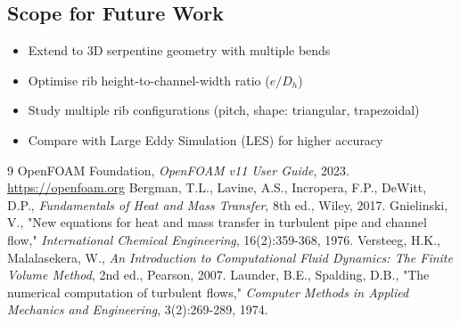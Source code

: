 \documentclass[12pt, a4paper]{article}
\begin{document}
\subsection{Scope for Future Work}
\begin{itemize}
    \item Extend to 3D serpentine geometry with multiple bends
    \item Optimise rib height-to-channel-width ratio ($e/D_h$)
    \item Study multiple rib configurations (pitch, shape: triangular, trapezoidal)
    \item Compare with Large Eddy Simulation (LES) for higher accuracy
\end{itemize}

\begin{thebibliography}{9}
     OpenFOAM Foundation, \emph{OpenFOAM v11 User Guide}, 2023. \url{https://openfoam.org}
     Bergman, T.L., Lavine, A.S., Incropera, F.P., DeWitt, D.P., \emph{Fundamentals of Heat and Mass Transfer}, 8th ed., Wiley, 2017.
     Gnielinski, V., "New equations for heat and mass transfer in turbulent pipe and channel flow," \emph{International Chemical Engineering}, 16(2):359-368, 1976.
     Versteeg, H.K., Malalasekera, W., \emph{An Introduction to Computational Fluid Dynamics: The Finite Volume Method}, 2nd ed., Pearson, 2007.
     Launder, B.E., Spalding, D.B., "The numerical computation of turbulent flows," \emph{Computer Methods in Applied Mechanics and Engineering}, 3(2):269-289, 1974.
\end{thebibliography}
\end{document}
